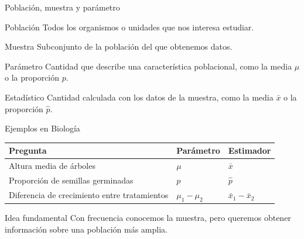 \documentclass[aspectratio=169,11pt]{beamer}
\begin{document}
\begin{frame}{Población, muestra y parámetro}
\begin{block}{Población}
Todos los organismos o unidades que nos interesa estudiar.
\end{block}

\begin{block}{Muestra}
Subconjunto de la población del que obtenemos datos.
\end{block}

\begin{block}{Parámetro}
Cantidad que describe una característica poblacional,
como la media $\mu$ o la proporción $p$.
\end{block}

\begin{block}{Estadístico}
Cantidad calculada con los datos de la muestra,
como la media $\bar{x}$ o la proporción $\hat{p}$.
\end{block}
\end{frame}

\begin{frame}{Ejemplos en Biología}
\begin{center}
\begin{tabular}{p{4cm}p{4cm}p{3cm}}
\toprule
\textbf{Pregunta} & \textbf{Parámetro} & \textbf{Estimador}\\
\midrule
Altura media de árboles & $\mu$ & $\bar{x}$\\
Proporción de semillas germinadas & $p$ & $\hat{p}$\\
Diferencia de crecimiento entre tratamientos
& $\mu_1-\mu_2$ & $\bar{x}_1-\bar{x}_2$\\
\bottomrule
\end{tabular}
\end{center}

\begin{alertblock}{Idea fundamental}
Con frecuencia conocemos la muestra, pero queremos
obtener información sobre una población más amplia.
\end{alertblock}
\end{frame}
\end{document}
